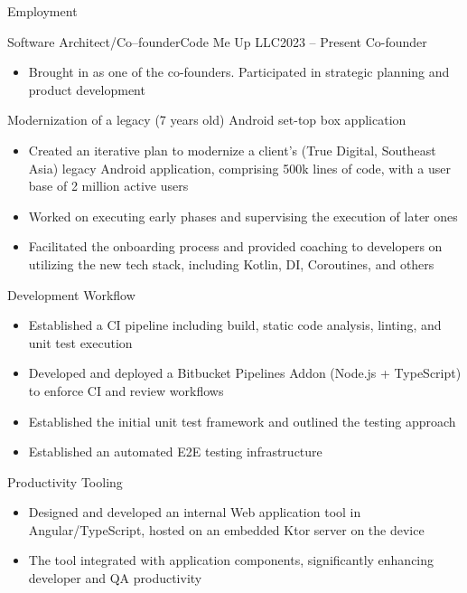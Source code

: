 \documentclass[]{mcdowellcv}
\begin{document}
	\makeheader

	\begin{cvsection}{Employment}
		\begin{cvsubsection}{Software Architect/Co--founder}{Code Me Up LLC}{2023 -- Present}
			Co-founder
			\begin{itemize}
				\item Brought in as one of the co-founders. Participated in strategic planning and product development \newline
			\end{itemize}

			Modernization of a legacy (7 years old) Android set-top box application
			\begin{itemize}
				\item Created an iterative plan to modernize a client's (True Digital, Southeast Asia) legacy Android application, comprising 500k lines of code, with a user base of 2 million active users
				\item Worked on executing early phases and supervising the execution of later ones
				\item Facilitated the onboarding process and provided coaching to developers on utilizing the new tech stack, including Kotlin, DI, Coroutines, and others \newline
			\end{itemize}

			Development Workflow
			\begin{itemize}
				\item Established a CI pipeline including build, static code analysis, linting, and unit test execution
				\item Developed and deployed a Bitbucket Pipelines Addon (Node.js + TypeScript) to enforce CI and review workflows
				\item Established the initial unit test framework and outlined the testing approach
				\item Established an automated E2E testing infrastructure \newline
			\end{itemize}

			Productivity Tooling
			\begin{itemize}
				\item Designed and developed an internal Web application tool in Angular/TypeScript, hosted on an embedded Ktor server on the device
				\item The tool integrated with application components, significantly enhancing developer and QA productivity \newline
			\end{itemize}


\end{cvsubsection}
\end{cvsection}
\end{document}
